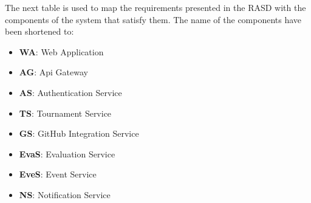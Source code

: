 The next table is used to map the requirements presented in the RASD with the components of the system that satisfy them. The name of the components have been shortened to:
\begin{itemize}
    \item \textbf{WA}: Web Application
    \item \textbf{AG}: Api Gateway
    \item \textbf{AS}: Authentication Service
    \item \textbf{TS}: Tournament Service
    \item \textbf{GS}: GitHub Integration Service
    \item \textbf{EvaS}: Evaluation Service
    \item \textbf{EveS}: Event Service
    \item \textbf{NS}: Notification Service
\end{itemize}

